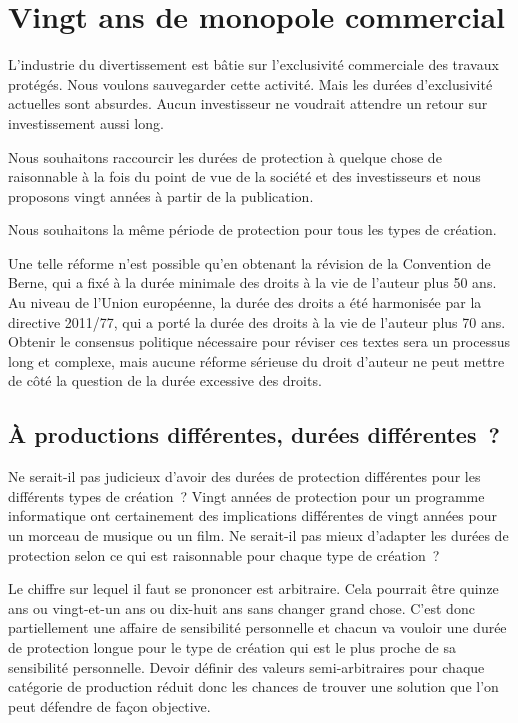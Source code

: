 \chapter{Vingt ans de monopole commercial}\label{dur}

L’industrie du divertissement est bâtie sur l’exclusivité commerciale des
travaux protégés. Nous voulons sauvegarder cette activité. Mais les durées d’exclusivité actuelles
sont absurdes. Aucun investisseur ne voudrait attendre un retour sur investissement aussi long.

\begin{mesure}
 Nous souhaitons raccourcir les durées de protection à quelque chose de raisonnable à la fois du
point de vue de la société et des investisseurs et nous proposons vingt années à partir de la
publication.

Nous souhaitons la même période de protection pour tous les types de création.
\end{mesure}

Une telle réforme n'est possible qu'en obtenant la révision de la Convention de Berne, qui a fixé à la durée minimale des droits à la vie de l'auteur plus 50 ans. Au niveau de l'Union européenne, la durée des droits a été harmonisée par la directive 2011/77, qui a porté la durée des droits à la vie de l'auteur plus 70 ans. Obtenir le consensus politique nécessaire pour réviser ces textes sera un processus long et complexe, mais aucune réforme sérieuse du droit d'auteur ne peut mettre de côté la question de la durée excessive des droits. 

\section{À productions différentes, durées différentes~?}

Ne serait-il pas judicieux d’avoir des durées de protection différentes pour les différents types de
création~? Vingt années de protection pour un programme informatique ont certainement des
implications différentes de vingt années pour un morceau de musique ou un film. Ne serait-il pas mieux
d’adapter les durées de protection selon ce qui est raisonnable pour chaque type de création~?

Le chiffre sur lequel il faut se prononcer est arbitraire. Cela pourrait être quinze ans ou vingt-et-un ans ou dix-huit ans sans changer grand chose. C'est donc partiellement une affaire de sensibilité personnelle et chacun va vouloir une durée de protection longue pour le type de création qui est le plus proche de sa sensibilité personnelle. Devoir définir des valeurs semi-arbitraires pour
chaque catégorie de production réduit donc les chances de trouver une
solution que l’on peut défendre de façon objective.

